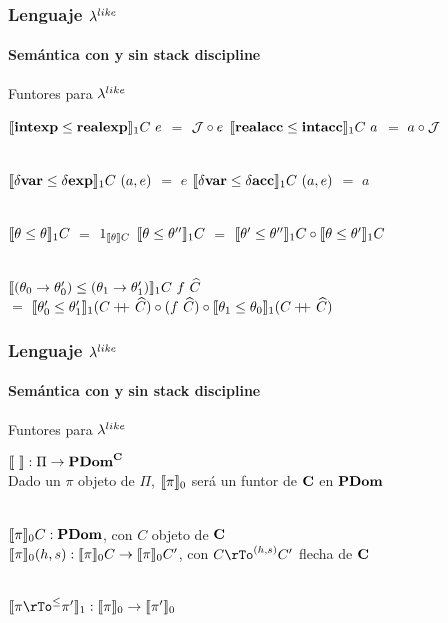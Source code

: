\documentclass{beamer}
\begin{document}
\begin{frame}
\frametitle{Lenguaje $\lambda^{like}$}
\framesubtitle{Semántica con y sin stack discipline}

\begin{block}{Funtores para $\lambda^{like}$}

$\semBrcks{\intexp \leq \realexp}_1 C \ e$ $=$ $\mathcal{J} \circ e$
\quad 
$\llbracket \textbf{realacc} \leq \textbf{intacc} \rrbracket_1 C \ a$ $=$ $a \circ \mathcal{J}$\\

\

$\semBrcks{\deltavar \leq \deltaexp}_1 C \ (a,e)$ $=$ $e$
\quad \quad \quad 
$\semBrcks{\deltavar \leq \deltaacc}_1 C \ (a,e)$ $=$ $a$\\

\


$\llbracket \theta \leq \theta \rrbracket_1 C$ $=$ $1_{\llbracket \theta \rrbracket C}$
\quad \quad \quad \quad 
$\llbracket \theta \leq \theta'' \rrbracket_1 C$ $=$ 
					$\llbracket \theta' \leq \theta'' \rrbracket_1 C \circ \llbracket \theta \leq \theta' \rrbracket_1 C$\\

\

$\semBrcks{(\theta_0 \rightarrow \theta'_0) \leq (\theta_1 \rightarrow \theta'_1)}_1 C \ f \ \widehat{C}$ \\
\quad \quad \quad \quad \quad 
			$=$ 
			$\llbracket \theta'_0 \leq \theta'_1 \rrbracket_1 (C +\kern-1.3ex+\kern0.8ex \widehat{C}) 
				\circ 
			(f \ \widehat{C}) 
				\circ 
			\llbracket \theta_1 \leq \theta_0 \rrbracket_1 (C +\kern-1.3ex+\kern0.8ex \widehat{C}) 
			$\\

\end{block}

\end{frame}

\begin{frame}
\frametitle{Lenguaje $\lambda^{like}$}
\framesubtitle{Semántica con y sin stack discipline}

\begin{block}{Funtores para $\lambda^{like}$}

$\llbracket  \  \rrbracket : \Pi \rightarrow \textbf{PDom}^{\textbf{C}}$\\
Dado un $\pi$ objeto de $\Pi$, $\llbracket \pi \rrbracket_{0}$ será un funtor 
de $\textbf{C}$ en $\textbf{PDom}$\\
\

$\llbracket \pi \rrbracket_{0}C : \textbf{PDom}$, con $C$ objeto de $\textbf{C}$\\
$\llbracket \pi \rrbracket_{0}(h,s) : \llbracket \pi \rrbracket_{0}C \rightarrow \llbracket \pi \rrbracket_{0}C'$, con 
$C \rTo^{(h,s)} C'$ flecha de $\textbf{C}$\\

\

$\semBrcks{\pi \rTo^{\leq} \pi'}_{1} : 
	\semBrcks{\pi}_{0} \rightarrow \semBrcks{\pi'}_{0}$\\

\end{block}

\end{frame}
\end{document}
